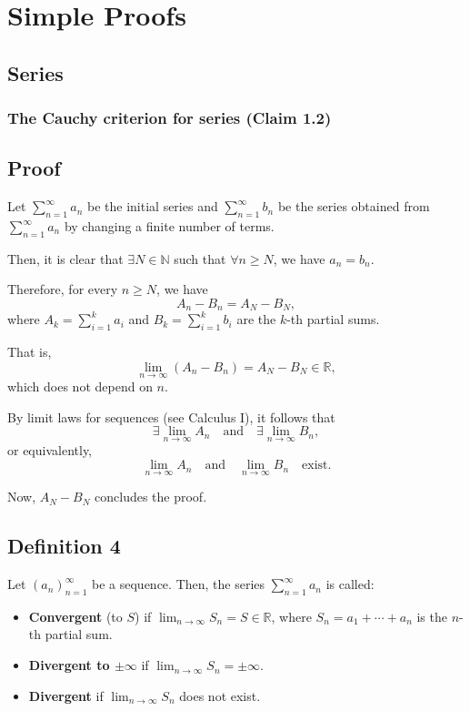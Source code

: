 \section{Simple Proofs}

\subsection{Series}

\subsubsection{The Cauchy criterion for series (Claim 1.2)}


\subsection*{Proof}
Let $\sum_{n=1}^\infty a_n$ be the initial series and $\sum_{n=1}^\infty b_n$ be the series obtained from $\sum_{n=1}^\infty a_n$ by changing a finite number of terms.

Then, it is clear that $\exists N \in \mathbb{N}$ such that $\forall n \geq N$, we have $a_n = b_n$.

Therefore, for every $n \geq N$, we have
\[
A_n - B_n = A_N - B_N,
\]
where $A_k = \sum_{i=1}^k a_i$ and $B_k = \sum_{i=1}^k b_i$ are the $k$-th partial sums.

That is,
\[
\lim_{n \to \infty} (A_n - B_n) = A_N - B_N \in \mathbb{R},
\]
which does not depend on $n$.

By limit laws for sequences (see Calculus I), it follows that
\[
\exists \lim_{n \to \infty} A_n \quad \text{and} \quad \exists \lim_{n \to \infty} B_n,
\]
or equivalently,
\[
\lim_{n \to \infty} A_n \quad \text{and} \quad \lim_{n \to \infty} B_n \quad \text{exist}.
\]

Now, $A_N - B_N$ concludes the proof.

\subsection*{Definition 4}
Let $(a_n)_{n=1}^\infty$ be a sequence. Then, the series $\sum_{n=1}^\infty a_n$ is called:
\begin{itemize}
    \item \textbf{Convergent} (to $S$) if $\lim_{n \to \infty} S_n = S \in \mathbb{R}$, where $S_n = a_1 + \cdots + a_n$ is the $n$-th partial sum.
    \item \textbf{Divergent to $\pm \infty$} if $\lim_{n \to \infty} S_n = \pm \infty$.
    \item \textbf{Divergent} if $\lim_{n \to \infty} S_n$ does not exist.
\end{itemize}

